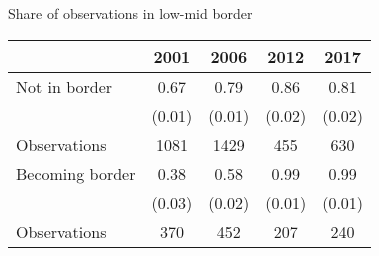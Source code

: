 \begin{center}
\begin{threeparttable}[!h]
\caption{Share of observations in low-mid border}
\begin{tabular}{lcccc}
\toprule
\toprule
\textbf{}&\multicolumn{1}{c}{\textbf{2001}}&\multicolumn{1}{c}{\textbf{2006}}&\multicolumn{1}{c}{\textbf{2012}}&\multicolumn{1}{c}{\textbf{2017}} \\
\midrule
Not in border       &        0.67&        0.79&        0.86&        0.81\\
                    &      (0.01)&      (0.01)&      (0.02)&      (0.02)\\
Observations        &        1081&        1429&         455&         630\\
\midrule Becoming border&        0.38&        0.58&        0.99&        0.99\\
                    &      (0.03)&      (0.02)&      (0.01)&      (0.01)\\
Observations        &         370&         452&         207&         240\\
\bottomrule
\bottomrule
\end{tabular}
\end{threeparttable}
\end{center}
